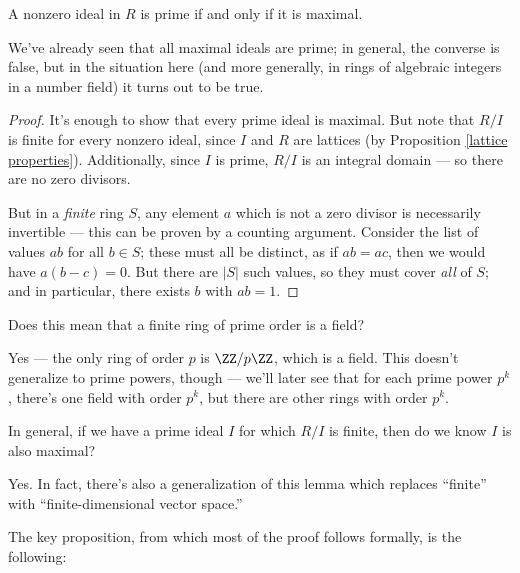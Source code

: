 \begin{lemma}
    A nonzero ideal in $R$ is prime if and only if it is maximal. 
\end{lemma}

We've already seen that all maximal ideals are prime; in general, the converse is false, but in the situation here (and more generally, in rings of algebraic integers in a number field) it turns out to be true. 

\begin{proof}
    It's enough to show that every prime ideal is maximal. But note that $R/I$ is finite for every nonzero ideal, since $I$ and $R$ are lattices (by Proposition \ref{lattice properties}). Additionally, since $I$ is prime, $R/I$ is an integral domain --- so there are no zero divisors. 
    
    But in a \emph{finite} ring $S$, any element $a$ which is not a zero divisor is necessarily invertible --- this can be proven by a counting argument. Consider the list of values $ab$ for all $b \in S$; these must all be distinct, as if $ab = ac$, then we would have $a(b - c) = 0$. But there are $\lvert S \rvert$ such values, so they must cover \emph{all} of $S$; and in particular, there exists $b$ with $ab = 1$.
\end{proof}

\begin{question}
    Does this mean that a finite ring of prime order is a field? 
\end{question}

\begin{ans}
Yes --- the only ring of order $p$ is $\ZZ/p\ZZ$, which is a field. This doesn't generalize to prime powers, though --- we'll later see that for each prime power $p^k$, there's one field with order $p^k$, but there are other rings with order $p^k$.
\end{ans}

\begin{question}
    In general, if we have a prime ideal $I$ for which $R/I$ is finite, then do we know $I$ is also maximal?
\end{question}

\begin{ans}
Yes. In fact, there's also a generalization of this lemma which replaces ``finite'' with ``finite-dimensional vector space.''
\end{ans}

The key proposition, from which most of the proof follows formally, is the following:

